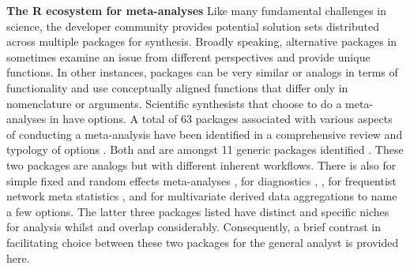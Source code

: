 \documentclass[softwarereview]{jss}
\begin{document}
\textbf{The R ecosystem for meta-analyses} \newline
Like many fundamental challenges in science, the  developer community provides potential solution sets distributed across multiple packages for synthesis.  Broadly speaking, alternative packages in  sometimes examine an issue from different perspectives and provide unique functions.  In other instances, packages can be very similar or analogs in terms of functionality and use conceptually aligned functions that differ only in nomenclature or arguments.  Scientific synthesists that choose to do a meta-analyses in  have options.  A total of 63 packages associated with various aspects of conducting a meta-analysis have been identified in a comprehensive review and typology of options \citep{RN6178}.  Both  \citep{RN6176} and  \citep{RN6175} are amongst 11 generic packages identified \citep{RN6178}.  These two packages are analogs but with different inherent workflows.  There is also  for simple fixed and random effects meta-analyses \citep{RN6195},  for diagnostics \citep{RN6196}, \citep{RN6196},  for frequentist network meta statistics \citep{RN6197}, and  for multivariate derived data aggregations \citep{RN6198} to name a few options.  The latter three packages listed have distinct and specific niches for analysis whilst  and  overlap considerably.  Consequently, a brief contrast in facilitating choice between these two packages for the general analyst is provided here. \newline
\end{document}
